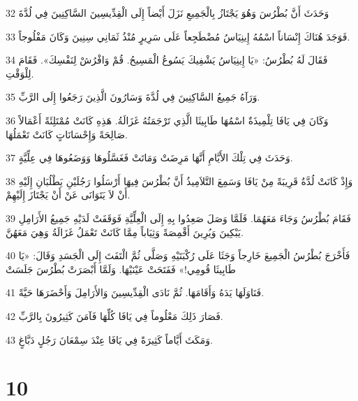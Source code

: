 \par 32 وَحَدَثَ أَنَّ بُطْرُسَ وَهُوَ يَجْتَازُ بِالْجَمِيعِ نَزَلَ أَيْضاً إِلَى الْقِدِّيسِينَ السَّاكِنِينَ فِي لُدَّةَ
\par 33 فَوَجَدَ هُنَاكَ إِنْسَاناً اسْمُهُ إِينِيَاسُ مُضْطَجِعاً عَلَى سَرِيرٍ مُنْذُ ثَمَانِي سِنِينَ وَكَانَ مَفْلُوجاً.
\par 34 فَقَالَ لَهُ بُطْرُسُ: «يَا إِينِيَاسُ يَشْفِيكَ يَسُوعُ الْمَسِيحُ. قُمْ وَافْرُشْ لِنَفْسِكَ». فَقَامَ لِلْوَقْتِ.
\par 35 وَرَآهُ جَمِيعُ السَّاكِنِينَ فِي لُدَّةَ وَسَارُونَ الَّذِينَ رَجَعُوا إِلَى الرَّبِّ.
\par 36 وَكَانَ فِي يَافَا تِلْمِيذَةٌ اسْمُهَا طَابِيثَا الَّذِي تَرْجَمَتُهُ غَزَالَةُ. هَذِهِ كَانَتْ مُمْتَلِئَةً أَعْمَالاً صَالِحَةً وَإِحْسَانَاتٍ كَانَتْ تَعْمَلُهَا.
\par 37 وَحَدَثَ فِي تِلْكَ الأَيَّامِ أَنَّهَا مَرِضَتْ وَمَاتَتْ فَغَسَّلُوهَا وَوَضَعُوهَا فِي عِلِّيَّةٍ.
\par 38 وَإِذْ كَانَتْ لُدَّةُ قَرِيبَةً مِنْ يَافَا وَسَمِعَ التَّلاَمِيذُ أَنَّ بُطْرُسَ فِيهَا أَرْسَلُوا رَجُلَيْنِ يَطْلُبَانِ إِلَيْهِ أَنْ لاَ يَتَوَانَى عَنْ أَنْ يَجْتَازَ إِلَيْهِمْ.
\par 39 فَقَامَ بُطْرُسُ وَجَاءَ مَعَهُمَا. فَلَمَّا وَصَلَ صَعِدُوا بِهِ إِلَى الْعِلِّيَّةِ فَوَقَفَتْ لَدَيْهِ جَمِيعُ الأَرَامِلِ يَبْكِينَ وَيُرِينَ أَقْمِصَةً وَثِيَاباً مِمَّا كَانَتْ تَعْمَلُ غَزَالَةُ وَهِيَ مَعَهُنَّ.
\par 40 فَأَخْرَجَ بُطْرُسُ الْجَمِيعَ خَارِجاً وَجَثَا عَلَى رُكْبَتَيْهِ وَصَلَّى ثُمَّ الْتَفَتَ إِلَى الْجَسَدِ وَقَالَ: «يَا طَابِيثَا قُومِي!» فَفَتَحَتْ عَيْنَيْهَا. وَلَمَّا أَبْصَرَتْ بُطْرُسَ جَلَسَتْ
\par 41 فَنَاوَلَهَا يَدَهُ وَأَقَامَهَا. ثُمَّ نَادَى الْقِدِّيسِينَ وَالأَرَامِلَ وَأَحْضَرَهَا حَيَّةً.
\par 42 فَصَارَ ذَلِكَ مَعْلُوماً فِي يَافَا كُلِّهَا فَآمَنَ كَثِيرُونَ بِالرَّبِّ.
\par 43 وَمَكَثَ أَيَّاماً كَثِيرَةً فِي يَافَا عِنْدَ سِمْعَانَ رَجُلٍ دَبَّاغٍ.

\chapter{10}

